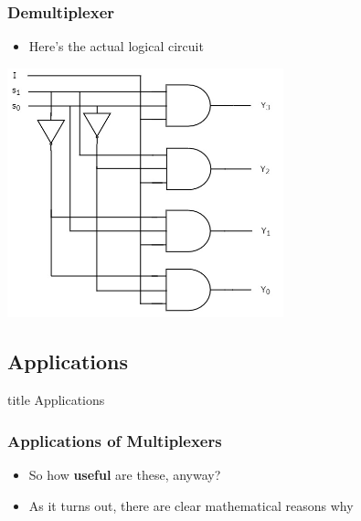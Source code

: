 \documentclass{beamer}
\begin{document}
\begin{frame}
\begin{tikzpicture}[x=0.75pt,y=0.75pt,yscale=-1,xscale=1]
\end{tikzpicture}

			\end{frame}
			
			\begin{frame}
             	\frametitle{Demultiplexer}
             	\begin{itemize}
             		\item Here's the actual logical circuit
             	\end{itemize}
             	\centering
             	\includegraphics[width=0.6\textwidth]{demultiplexer}
             \end{frame}	
			
			
             
        \subsection{Applications}
             
             \begin{frame}
                \vfill
                \centering
                \begin{beamercolorbox}[sep=8pt,center,shadow=true,rounded=true]{title}
                    Applications\par%
                \end{beamercolorbox}
                \vfill
             \end{frame}
             
             \begin{frame}
             	\frametitle{Applications of Multiplexers}
             	\begin{itemize}
             		\item So how \textbf{useful} are these, anyway?
             		\item As it turns out, there are clear mathematical reasons why
             	\end{itemize}
             	
             \end{frame}
             
\end{document}
